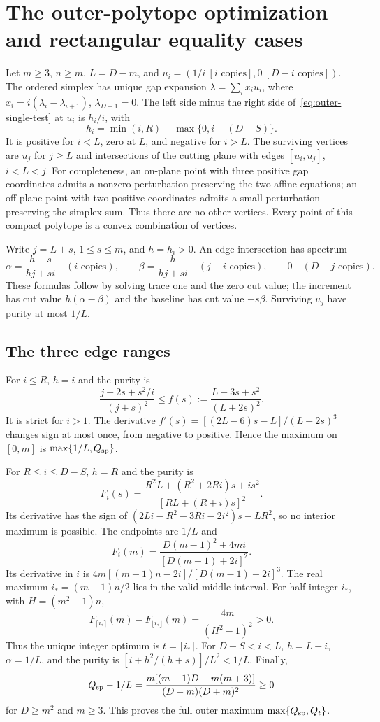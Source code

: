 \section{The outer-polytope optimization and rectangular equality cases}\label{app:rectangular}
Let $m\geq3$, $n\geq m$, $L=D-m$, and
$u_i=(1/i\ [i\text{ copies}],0\ [D-i\text{ copies}])$.
The ordered simplex has unique gap expansion
$\lambda=\sum_i x_i u_i$, where
$x_i=i(\lambda_i-\lambda_{i+1})$, $\lambda_{D+1}=0$.
The left side minus the right side of~\eqref{eq:outer-single-test}
at $u_i$ is $h_i/i$, with
\[
 h_i=\min(i,R)-\max\{0,i-(D-S)\}.
\]
It is positive for $i<L$, zero at $L$, and negative for $i>L$.
The surviving vertices are $u_j$ for $j\geq L$ and intersections
of the cutting plane with edges $[u_i,u_j]$, $i<L<j$.
For completeness, an on-plane point with three positive gap
coordinates admits a nonzero perturbation preserving the two
affine equations; an off-plane point with two positive coordinates
admits a small perturbation preserving the simplex sum.
Thus there are no other vertices. Every point of this compact
polytope is a convex combination of vertices.

Write $j=L+s$, $1\leq s\leq m$, and $h=h_i>0$.
An edge intersection has spectrum
\[
 \alpha=\frac{h+s}{hj+si}\quad(i\text{ copies}),\qquad
 \beta=\frac h{hj+si}\quad(j-i\text{ copies}),\qquad
 0\quad(D-j\text{ copies}).
\]
These formulas follow by solving trace one and the zero cut value;
the increment has cut value $h(\alpha-\beta)$ and the baseline
has cut value $-s\beta$. Surviving $u_j$ have purity at most $1/L$.

\subsection{The three edge ranges}
For $i\leq R$, $h=i$ and the purity is
\[
 \frac{j+2s+s^2/i}{(j+s)^2}
 \leq f(s):=\frac{L+3s+s^2}{(L+2s)^2}.
\]
It is strict for $i>1$. The derivative
$f'(s)=[(2L-6)s-L]/(L+2s)^3$ changes sign at most once,
from negative to positive. Hence the maximum on $[0,m]$
is $\max\{1/L,Q_{\rm sp}\}$.

For $R\leq i\leq D-S$, $h=R$ and the purity is
\[
 F_i(s)=\frac{R^2L+(R^2+2Ri)s+is^2}{[RL+(R+i)s]^2}.
\]
Its derivative has the sign of
$(2Li-R^2-3Ri-2i^2)s-LR^2$, so no interior maximum is possible.
The endpoints are $1/L$ and
\[
 F_i(m)=\frac{D(m-1)^2+4mi}{[D(m-1)+2i]^2}.
\]
Its derivative in $i$ is
$4m[(m-1)n-2i]/[D(m-1)+2i]^3$.
The real maximum $i_*=(m-1)n/2$ lies in the valid middle interval.
For half-integer $i_*$, with $H=(m^2-1)n$,
\[
 F_{\lceil i_*\rceil}(m)-F_{\lfloor i_*\rfloor}(m)
 =\frac{4m}{(H^2-1)^2}>0.
\]
Thus the unique integer optimum is $t=\lceil i_*\rceil$.
For $D-S<i<L$, $h=L-i$, $\alpha=1/L$, and the purity is
$[i+h^2/(h+s)]/L^2<1/L$.
Finally,
\[
 Q_{\rm sp}-1/L=
 \frac{m[(m-1)D-m(m+3)]}{(D-m)(D+m)^2}\geq0
\]
for $D\geq m^2$ and $m\geq3$.
This proves the full outer maximum $\max\{Q_{\rm sp},Q_t\}$.

